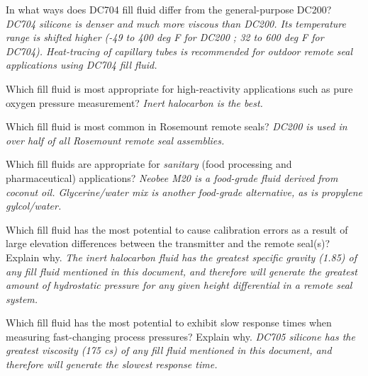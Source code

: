 







In what ways does DC704 fill fluid differ from the general-purpose DC200?  {\it DC704 silicone is denser and much more viscous than DC200.  Its temperature range is shifted higher (-49 to 400 deg F for DC200 ; 32 to 600 deg F for DC704).  Heat-tracing of capillary tubes is recommended for outdoor remote seal applications using DC704 fill fluid.}

\vskip 10pt

Which fill fluid is most appropriate for high-reactivity applications such as pure oxygen pressure measurement?  {\it Inert halocarbon is the best.}

\vskip 10pt

Which fill fluid is most common in Rosemount remote seals?  {\it DC200 is used in over half of all Rosemount remote seal assemblies.}

\vskip 10pt

Which fill fluids are appropriate for {\it sanitary} (food processing and pharmaceutical) applications?  {\it Neobee M20 is a food-grade fluid derived from coconut oil.  Glycerine/water mix is another food-grade alternative, as is propylene gylcol/water.}

\vskip 10pt

Which fill fluid has the most potential to cause calibration errors as a result of large elevation differences between the transmitter and the remote seal(s)?  Explain why.  {\it The inert halocarbon fluid has the greatest specific gravity (1.85) of any fill fluid mentioned in this document, and therefore will generate the greatest amount of hydrostatic pressure for any given height differential in a remote seal system.}

\vskip 10pt

Which fill fluid has the most potential to exhibit slow response times when measuring fast-changing process pressures?  Explain why.  {\it DC705 silicone has the greatest viscosity (175 cs) of any fill fluid mentioned in this document, and therefore will generate the slowest response time.}





